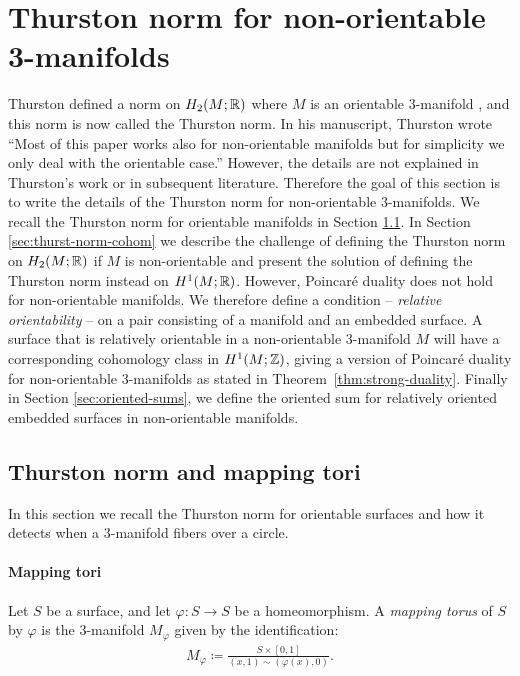 \section{Thurston norm for non-orientable 3-manifolds}
\label{sec:thur-norm-non-orientable}
Thurston defined a norm on $H_2(M;\mathbb{R})$ where $M$ is an orientable 3-manifold \cite{thurston1986norm}, and this norm is now called the Thurston norm.  In his manuscript, Thurston wrote ``Most of this paper works also for non-orientable manifolds but for simplicity we only deal with the orientable case.''  However, the details are not explained in Thurston's work or in subsequent literature.  Therefore the goal of this section is to write the details of the Thurston norm for non-orientable 3-manifolds.
We recall the Thurston norm for orientable manifolds in Section \ref{sec:backgr-thurst-norm}.
In Section \ref{sec:thurst-norm-cohom} we describe the challenge of defining the Thurston norm on $H_2(M;\mathbb{R})$ if $M$ is non-orientable and present the solution of defining the Thurston norm instead on $H^1(M;\mathbb{R})$.
However, Poincar\'e duality does not hold for non-orientable manifolds.
We therefore define a condition -- {\it relative orientability} -- on a pair consisting of a manifold and an embedded surface.
A surface that is relatively orientable in a non-orientable 3-manifold $M$ will have a corresponding cohomology class in $H^1(M;\mathbb{Z})$, giving a version of Poincar\'e duality for non-orientable 3-manifolds as stated in Theorem~\ref{thm:strong-duality}.
Finally in Section \ref{sec:oriented-sums}, we define the oriented sum for relatively oriented embedded surfaces in non-orientable manifolds.

\subsection{Thurston norm and mapping tori}
\label{sec:backgr-thurst-norm}
In this section we recall the Thurston norm for orientable surfaces and how it detects when a 3-manifold fibers over a circle.

\paragraph{Mapping tori} Let $S$ be a surface, and let $\varphi: S \to S$ be a homeomorphism.  A {\it mapping torus} of $S$ by $\varphi$ is the $3$-manifold $M_\varphi$ given by the identification:
\begin{align*}
  M_\varphi \coloneqq \frac{S \times [0,1]}{(x,1) \sim (\varphi(x), 0)}.
\end{align*}

